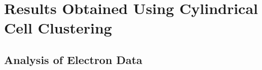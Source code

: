 %
%
%
%
%











%
%
%
%
%
%






%
%
%
%
%
%
%
%
%
%




\section{Results Obtained Using Cylindrical Cell Clustering}

\subsection{Analysis of Electron Data}
\label{TB_results_electrons}
%
%
%

